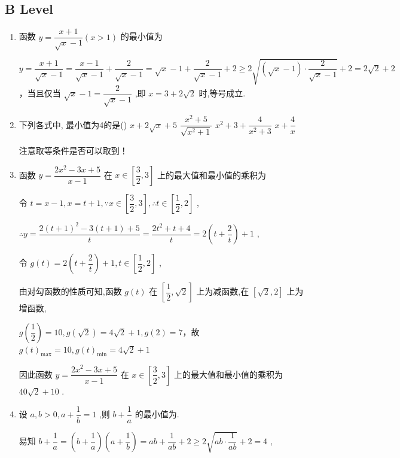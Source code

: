 \subsection*{B Level}
\begin{enumerate}
    \item 函数 $y = \dfrac{x + 1}{\sqrt{x} - 1}\left( {x > 1}\right)$ 的最小值为
    \begin{jieda}
        $y = \dfrac{x + 1}{\sqrt{x} - 1} = \dfrac{x - 1}{\sqrt{x} - 1} + \dfrac{2}{\sqrt{x} - 1} = \sqrt{x} - 1 + \dfrac{2}{\sqrt{x} - 1} + 2 \geq  2\sqrt{\left( {\sqrt{x} - 1}\right)  \cdot  \dfrac{2}{\sqrt{x} - 1}} + 2 = 2\sqrt{2} + 2$，当且仅当 $\sqrt{x} - 1 = \dfrac{2}{\sqrt{x} - 1}$ ,即 $x = 3 + 2\sqrt{2}$ 时,等号成立.
    \end{jieda}
    \item 下列各式中, 最小值为4的是\dotfill()
    \xx
    {$x+2\sqrt{x}+5$}
    {$\dfrac{x^2+5}{\sqrt{x^2+1}}$}
    {$x^2+3+\dfrac{4}{x^2+3}$}
    {$x+\dfrac{4}{x}$}
    \begin{jieda}
        注意取等条件是否可以取到！
    \end{jieda}
    \item 函数 $y = \dfrac{2{x}^{2} - {3x} + 5}{x - 1}$ 在 $x \in  \left\lbrack  {\dfrac{3}{2},3}\right\rbrack$ 上的最大值和最小值的乘积为
    \begin{jieda}
        令 $t = x - 1,x = t + 1,\because x \in  \left\lbrack  {\dfrac{3}{2},3}\right\rbrack  ,\therefore t \in  \left\lbrack  {\dfrac{1}{2},2}\right\rbrack$ ,
        
        $\therefore y = \dfrac{2{\left( t + 1\right) }^{2} - 3\left( {t + 1}\right)  + 5}{t} = \dfrac{2{t}^{2} + t + 4}{t} = 2\left( {t + \dfrac{2}{t}}\right)  + 1$ ,
        
        令 $g\left( t\right)  = 2\left( {t + \dfrac{2}{t}}\right)  + 1,t \in  \left\lbrack  {\dfrac{1}{2},2}\right\rbrack$ ,
        
        由对勾函数的性质可知,函数 $g\left( t\right)$ 在 $\left\lbrack  {\dfrac{1}{2},\sqrt{2}}\right\rbrack$ 上为减函数,在 $\left\lbrack  {\sqrt{2},2}\right\rbrack$ 上为增函数,
        
        $g\left( \dfrac{1}{2}\right)  = {10},g\left( \sqrt{2}\right)  = 4\sqrt{2} + 1,g\left( 2\right)  = 7$，故$g{\left( t\right) }_{\max } = {10},g{\left( t\right) }_{\min } = 4\sqrt{2} + 1$
        
        因此函数 $y = \dfrac{2{x}^{2} - {3x} + 5}{x - 1}$ 在 $x \in  \left\lbrack  {\dfrac{3}{2},3}\right\rbrack$ 上的最大值和最小值的乘积为 ${40}\sqrt{2} + {10}$ .
    \end{jieda}
    \item 设 $a,b > 0,a + \dfrac{1}{b} = 1$ ,则 $b + \dfrac{1}{a}$ 的最小值为.
    \begin{jieda}
        易知 $b + \dfrac{1}{a} = \left( {b + \dfrac{1}{a}}\right) \left( {a + \dfrac{1}{b}}\right)  = {ab} + \dfrac{1}{ab} + 2 \geq  2\sqrt{{ab} \cdot  \dfrac{1}{ab}} + 2 = 4$ ,
        

\end{jieda}
\end{enumerate}

